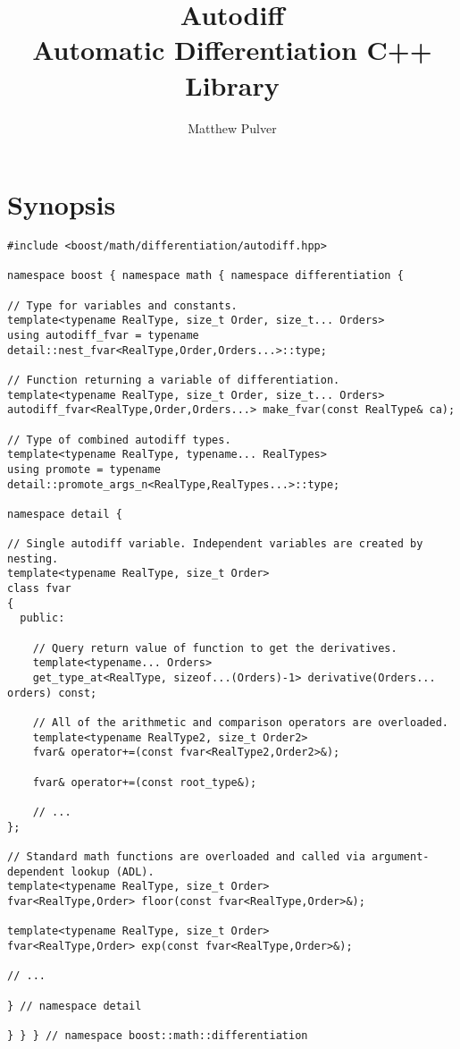 \documentclass{article}
\begin{document}
\title{Autodiff\\
\large Automatic Differentiation C++ Library}
\author{Matthew Pulver}
\maketitle



\section{Synopsis}

\begingroup
\fontsize{10pt}{10pt}\selectfont
\begin{verbatim}
#include <boost/math/differentiation/autodiff.hpp>

namespace boost { namespace math { namespace differentiation {

// Type for variables and constants.
template<typename RealType, size_t Order, size_t... Orders>
using autodiff_fvar = typename detail::nest_fvar<RealType,Order,Orders...>::type;

// Function returning a variable of differentiation.
template<typename RealType, size_t Order, size_t... Orders>
autodiff_fvar<RealType,Order,Orders...> make_fvar(const RealType& ca);

// Type of combined autodiff types.
template<typename RealType, typename... RealTypes>
using promote = typename detail::promote_args_n<RealType,RealTypes...>::type;

namespace detail {

// Single autodiff variable. Independent variables are created by nesting.
template<typename RealType, size_t Order>
class fvar
{
  public:

    // Query return value of function to get the derivatives.
    template<typename... Orders>
    get_type_at<RealType, sizeof...(Orders)-1> derivative(Orders... orders) const;

    // All of the arithmetic and comparison operators are overloaded.
    template<typename RealType2, size_t Order2>
    fvar& operator+=(const fvar<RealType2,Order2>&);

    fvar& operator+=(const root_type&);

    // ...
};

// Standard math functions are overloaded and called via argument-dependent lookup (ADL).
template<typename RealType, size_t Order>
fvar<RealType,Order> floor(const fvar<RealType,Order>&);

template<typename RealType, size_t Order>
fvar<RealType,Order> exp(const fvar<RealType,Order>&);

// ...

} // namespace detail

} } } // namespace boost::math::differentiation
\end{verbatim}
\endgroup
\end{document}
